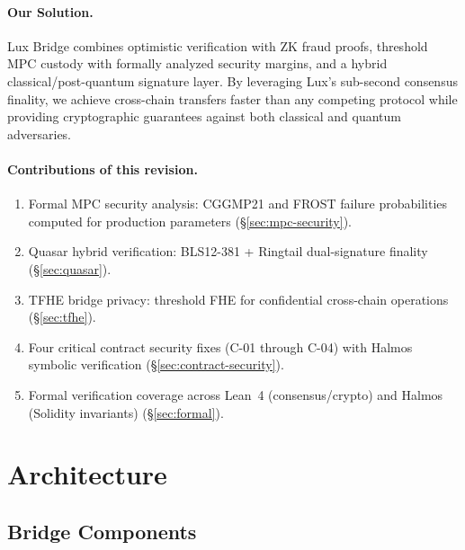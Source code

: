 \documentclass[11pt]{article}
\begin{document}
\paragraph{Our Solution.} Lux Bridge combines optimistic verification with ZK fraud proofs, threshold MPC custody with formally analyzed security margins, and a hybrid classical/post-quantum signature layer. By leveraging Lux's sub-second consensus finality, we achieve cross-chain transfers faster than any competing protocol while providing cryptographic guarantees against both classical and quantum adversaries.

\paragraph{Contributions of this revision.}
\begin{enumerate}[leftmargin=1.1em]
  \item Formal MPC security analysis: CGGMP21 and FROST failure probabilities computed for production parameters (\S\ref{sec:mpc-security}).
  \item Quasar hybrid verification: BLS12-381 + Ringtail dual-signature finality (\S\ref{sec:quasar}).
  \item TFHE bridge privacy: threshold FHE for confidential cross-chain operations (\S\ref{sec:tfhe}).
  \item Four critical contract security fixes (C-01 through C-04) with Halmos symbolic verification (\S\ref{sec:contract-security}).
  \item Formal verification coverage across Lean~4 (consensus/crypto) and Halmos (Solidity invariants) (\S\ref{sec:formal}).
\end{enumerate}

\section{Architecture}

\subsection{Bridge Components}
\end{document}
